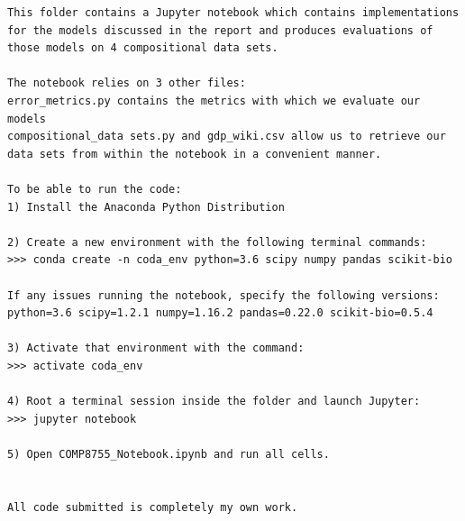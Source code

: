\documentclass[BSc]{usydthesis}
\numberwithin{equation}{chapter}
\theoremstyle{remark}
\begin{document}
\begin{verbatim}
This folder contains a Jupyter notebook which contains implementations
for the models discussed in the report and produces evaluations of
those models on 4 compositional data sets. 

The notebook relies on 3 other files:
error_metrics.py contains the metrics with which we evaluate our models
compositional_data sets.py and gdp_wiki.csv allow us to retrieve our
data sets from within the notebook in a convenient manner.

To be able to run the code:
1) Install the Anaconda Python Distribution

2) Create a new environment with the following terminal commands:
>>> conda create -n coda_env python=3.6 scipy numpy pandas scikit-bio

If any issues running the notebook, specify the following versions:
python=3.6 scipy=1.2.1 numpy=1.16.2 pandas=0.22.0 scikit-bio=0.5.4

3) Activate that environment with the command:
>>> activate coda_env

4) Root a terminal session inside the folder and launch Jupyter:
>>> jupyter notebook

5) Open COMP8755_Notebook.ipynb and run all cells. 


All code submitted is completely my own work. 

\end{verbatim}
\end{document}
